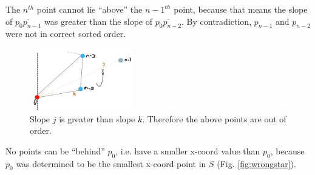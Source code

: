 \documentclass [12pt]{article}
\begin{document}
\begin{enumerate}[label=(\alph*)]
        \pagebreak

        The $n^{th}$ point cannot lie ``above'' the $n-1^{th}$ point, because that means the slope of $\overline{p_0 p_{n - 1}}$ was greater than the slope of $\overline{p_0 p_{n - 2}}$. By contradiction, $p_{n-1}$ and $p_{n-2}$ were not in correct sorted order.

        \begin{figure}[h] 
            \centering
            \includegraphics[width=0.4\textwidth]{images/star9.PNG}
            \caption{Slope $j$ is greater than slope $k$. Therefore the above points are out of order.}
            \label{fig:star9}
        \end{figure} 


        \pagebreak

        No points can be ``behind'' $p_0$, i.e. have a smaller x-coord value than $p_0$, because $p_0$ was determined to be the smallest x-coord point in $S$ (Fig. \ref{fig:wrongstar}).


\end{enumerate}
\end{document}
